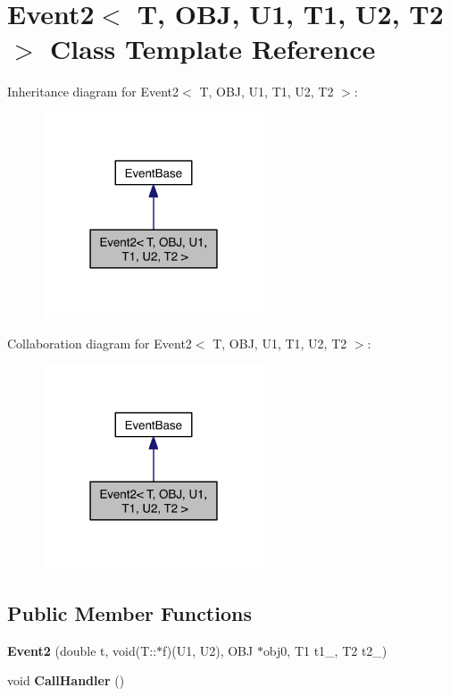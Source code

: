 \hypertarget{class_event2}{\section{Event2$<$ T, O\-B\-J, U1, T1, U2, T2 $>$ Class Template Reference}
\label{class_event2}
}


Inheritance diagram for Event2$<$ T, O\-B\-J, U1, T1, U2, T2 $>$\-:\nopagebreak
\begin{figure}[H]
\begin{center}
\leavevmode
\includegraphics[width=186pt]{class_event2__inherit__graph}
\end{center}
\end{figure}


Collaboration diagram for Event2$<$ T, O\-B\-J, U1, T1, U2, T2 $>$\-:\nopagebreak
\begin{figure}[H]
\begin{center}
\leavevmode
\includegraphics[width=186pt]{class_event2__coll__graph}
\end{center}
\end{figure}
\subsection*{Public Member Functions}
\begin{DoxyCompactItemize}
\item 
\hypertarget{class_event2_aba7c624909641184917f7a5603ab2ebe}{{\bfseries Event2} (double t, void(T\-::$\ast$f)(U1, U2), O\-B\-J $\ast$obj0, T1 t1\-\_, T2 t2\-\_)}\label{class_event2_aba7c624909641184917f7a5603ab2ebe}

\item 
\hypertarget{class_event2_a428b314837eee680fa435cad61944af3}{void {\bfseries Call\-Handler} ()}\label{class_event2_a428b314837eee680fa435cad61944af3}

\end{DoxyCompactItemize}

